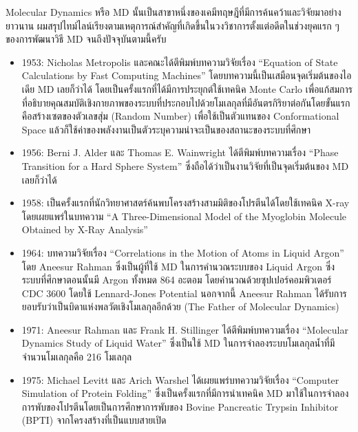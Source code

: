 Molecular Dynamics หรือ MD นั้นเป็นสาขาหนึ่งของเคมีทฤษฎีที่มีการค้นคว้าและวิจัยมาอย่างยาวนาน ผมสรุปไทม์ไลน์เรียงตามเหตุการณ์สำคัญที่เกิดขึ้นในวงวิชาการตั้งแต่อดีตในช่วงยุคแรก ๆ ของการพัฒนาวิธี MD จนถึงปัจจุบันตามนี้ครับ
%
\begin{itemize}[topsep=0pt,noitemsep]
  \setlength\itemsep{0.5em}
  \item 1953: Nicholas Metropolis และคณะได้ตีพิมพ์บทความวิจัยเรื่อง \enquote{Equation of State Calculations by Fast Computing Machines}\autocite{metropolis1953} โดยบทความนี้เป็นเสมือนจุดเริ่มต้นของไอเดีย MD เลยก็ว่าได้ โดยเป็นครั้งแรกที่ได้มีการประยุกต์ใช้เทคนิค Monte Carlo เพื่อแก้สมการที่อธิบายคุณสมบัติเชิงกายภาพของระบบที่ประกอบไปด้วยโมเลกุลที่มีอันตรกิริยาต่อกันโดยขั้นแรกคือสร้างเซตของตัวเลขสุ่ม (Random Number) เพื่อใช้เป็นตัวแทนของ Conformational Space แล้วก็ใช้ค่าของพลังงานเป็นตัวระบุความน่าจะเป็นของสถานะของระบบที่ศึกษา

  \item 1956: Berni J. Alder และ Thomas E. Wainwright ได้ตีพิมพ์บทความเรื่อง \enquote{Phase Transition for a Hard Sphere System}\autocite{alder1957} ซึ่งถือได้ว่าเป็นงานวิจัยที่เป็นจุดเริ่มต้นของ MD เลยก็ว่าได้

  \item 1958: เป็นครั้งแรกที่นักวิทยาศาสตร์ค้นพบโครงสร้างสามมิติของโปรตีนได้โดยใช้เทคนิค X-ray โดยเผยแพร่ในบทความ \enquote{A Three-Dimensional Model of the Myoglobin Molecule Obtained by X-Ray Analysis}\autocite{kendrew1958}

  \item 1964: บทความวิจัยเรื่อง \enquote{Correlations in the Motion of Atoms in Liquid Argon}\autocite{rahman1964} โดย Aneesur Rahman ซึ่งเป็นผู้ที่ใช้ MD ในการคำนวณระบบของ Liquid Argon ซึ่งระบบที่ศึกษาตอนนั้นมี Argon ทั้งหมด 864 อะตอม โดยคำนวณด้วยซุปเปอร์คอมพิวเตอร์  CDC 3600 โดยใช้ Lennard-Jones Potential นอกจากนี้ Aneesur Rahman ได้รับการยอบรับว่าเป็นบิดาแห่งพลวัตเชิงโมเลกุลอีกด้วย (The Father of Molecular Dynamics)

  \item 1971: Aneesur Rahman และ Frank H. Stillinger ได้ตีพิมพ์บทความเรื่อง \enquote{Molecular Dynamics Study of Liquid Water}\autocite{rahman1971} ซึ่งเป็นใช้ MD ในการจำลองระบบโมเลกุลน้ำที่มีจำนวนโมเลกุลคือ 216 โมเลกุล

  \item 1975: Michael Levitt และ Arich Warshel ได้เผยแพร่บทความวิจัยเรื่อง \enquote{Computer Simulation of Protein Folding}\autocite{levitt1975} ซึ่งเป็นครั้งแรกที่มีการนำเทคนิค MD มาใช้ในการจำลองการพับของโปรตีนโดยเป็นการศึกษาการพับของ Bovine Pancreatic Trypsin Inhibitor (BPTI) จากโครงสร้างที่เป็นแบบสายเปิด


\end{itemize}
